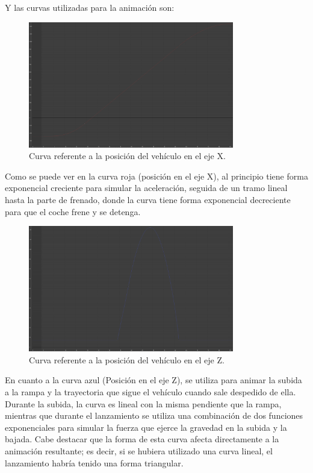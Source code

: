 \documentclass{article}
\begin{document}
Y las curvas utilizadas para la animación son:
\begin{figure}[H]
    \centering
    \includegraphics[width=0.8\textwidth]{imagenes/Ejercicio2/corregidas/curvas/red.png}
    \caption{Curva referente a la posición del vehículo en el eje X.}
\end{figure}

\bigskip

Como se puede ver en la curva roja (posición en el eje X), al principio tiene forma exponencial creciente para simular la aceleración, seguida de un tramo lineal hasta la parte de frenado, donde la curva tiene forma exponencial decreciente para que el coche frene y se detenga.

\begin{figure}[H]
    \centering
    \includegraphics[width=0.8\textwidth]{imagenes/Ejercicio2/corregidas/curvas/blue.png}
    \caption{Curva referente a la posición del vehículo en el eje Z.}
\end{figure}

\bigskip

En cuanto a la curva azul (Posición en el eje Z), se utiliza para animar la subida a la rampa y la trayectoria que sigue el vehículo cuando sale despedido de ella. Durante la subida, la curva es lineal con la misma pendiente que la rampa, mientras que durante el lanzamiento se utiliza una combinación de dos funciones exponenciales para simular la fuerza que ejerce la gravedad en la subida y la bajada. Cabe destacar que la forma de esta curva afecta directamente a la animación resultante; es decir, si se hubiera utilizado una curva lineal, el lanzamiento habría tenido una forma triangular.
\end{document}
